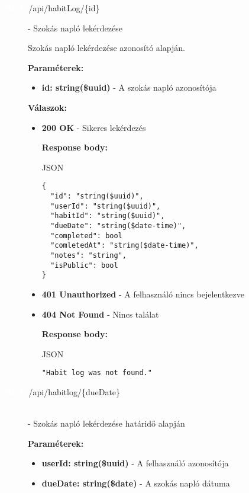 \documentclass[12pt]{report}
\newcommand{\httpGet}[1]{\colorbox{getColor}{\textbf{\textcolor{white}{GET}}}~#1}
\begin{document}
\begin{itemize}
\begin{description}
  \item[\httpGet{/api/habitLog/\{id\}}] - Szokás napló lekérdezése
  
    \vspace{0.5cm}
    Szokás napló lekérdezése azonosító alapján.

    \vspace{0.5cm}
    \textbf{Paraméterek:}
    \begin{itemize}
      \item \textbf{id: string(\$uuid)} - A szokás napló azonosítója
    \end{itemize}

    \vspace{0.5cm}
    \textbf{Válaszok:}
    \begin{itemize}
      \item \textbf{200 OK} - Sikeres lekérdezés

        \textbf{Response body:}
        \begin{codeblock}{JSON}
          \begin{verbatim}
{
  "id": "string($uuid)",
  "userId": "string($uuid)",
  "habitId": "string($uuid)",
  "dueDate": "string($date-time)",
  "completed": bool
  "comletedAt": "string($date-time)",
  "notes": "string",
  "isPublic": bool
}
          \end{verbatim}
        \end{codeblock}

      \item \textbf{401 Unauthorized} - A felhasználó nincs bejelentkezve

      \item \textbf{404 Not Found} - Nincs találat

        \textbf{Response body:}
        \begin{codeblock}{JSON}
          \begin{verbatim}
"Habit log was not found."
          \end{verbatim}
        \end{codeblock}
    \end{itemize}

  \item[\httpGet{/api/habitlog/\{dueDate\}}] 
  \hfill \\ - Szokás napló lekérdezése határidő alapján
  
    \vspace{0.5cm}
    \textbf{Paraméterek:}
    \begin{itemize}
      \item \textbf{userId: string(\$uuid)} - A felhasználó azonosítója
      \item \textbf{dueDate: string(\$date)} - A szokás napló dátuma
    \end{itemize}


\end{description}
\end{itemize}
\end{document}
